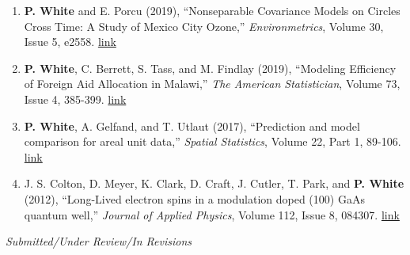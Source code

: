 \documentclass[12pt]{article}
\begin{document}
\begin{enumerate}[label=$\bullet$]
\item \textbf{P. White} and E. Porcu (2019), ``Nonseparable Covariance Models on Circles Cross Time: A Study of Mexico City Ozone,'' \emph{Environmetrics}, Volume 30, Issue 5, e2558. \href{https://onlinelibrary.wiley.com/doi/full/10.1002/env.2558}{link}
\item \textbf{P. White}, C. Berrett, S. Tass, and M. Findlay (2019), ``Modeling Efficiency of Foreign Aid Allocation in Malawi,'' \emph{The American Statistician}, Volume 73, Issue 4, 385-399.  \href{https://www.tandfonline.com/doi/full/10.1080/00031305.2018.1470032}{link}
\item \textbf{P. White}, A. Gelfand, and T. Utlaut (2017), ``Prediction and model comparison for areal unit data,'' \emph{Spatial Statistics}, Volume 22, Part 1, 89-106. \href{http://www.sciencedirect.com/science/article/pii/S2211675317301422}{link}
\item J. S. Colton, D. Meyer, K. Clark, D. Craft, J. Cutler, T. Park, and \textbf{P. White} (2012), ``Long-Lived electron spins in a modulation doped (100) GaAs quantum well,'' \emph{Journal of Applied Physics}, Volume 112, Issue 8, 084307.  \href{http://aip.scitation.org/doi/abs/10.1063/1.4759320}{link}
\end{enumerate}

\emph{Submitted/Under Review/In Revisions}
\end{document}
